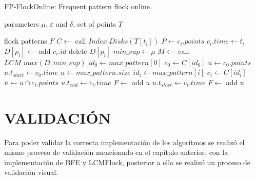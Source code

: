 \begin{algorithm}
    \renewcommand{\algorithmicrequire}{\textbf{Input:}}
    \renewcommand{\algorithmicensure}{\textbf{Output:}}
    \renewcommand{\algorithmicprint}{\textbf{break}}
  \caption{FP-FlockOnline: Frequent pattern flock  online.}

  \label{alg:framework2}


  \footnotesize

  \begin{algorithmic}[1]

\REQUIRE parameters $\mu$, $\varepsilon$ and $\delta$,
set of points $T$ 

\ENSURE flock patterns $F$
    \STATE $C \leftarrow$ call $Index.Disks(T[t_i])$     
      \STATE $P \leftarrow c_i.points$ 
	  \STATE $c_i.time \leftarrow t_i$
	  \STATE $D[p_i] \leftarrow $ add $c_i.id$
      \ENDFOR
	    \STATE delete $D[p_i]$
	  \ENDIF
      \ENDFOR
    \ENDFOR
  \STATE $min\_sup \leftarrow \mu$
  \STATE $M \leftarrow$ call $LCM\_max(D,min\_sup)$ 
  \STATE $id_0 \leftarrow max\_pattern[0]$
  \STATE $c_0 \leftarrow C[id_0]$
  \STATE $u \leftarrow c_0.points$
  \STATE $u.t_{start} \leftarrow c_0.time$
  \STATE $n \leftarrow max\_pattern.size$ 
	\STATE $id_i \leftarrow max\_pattern[i]$
	\STATE $c_i \leftarrow C[id_i]$
	  \STATE $u \leftarrow u \cap c_i.points$
	  \STATE $u.t_{end} \leftarrow c_i.time$
	\ELSE
		\STATE $F \leftarrow$ add $u$
		\STATE $u.t_{start} \leftarrow c_i.time$
	  \ENDIF
	\ENDIF
  \ENDFOR
	\STATE $F \leftarrow$ add $u$
  \ENDIF
\ENDFOR
\ENDFOR

\end{algorithmic}

\end{algorithm}

\section{VALIDACIÓN}
 
Para poder validar la correcta implementación de los algoritmos se realizó el mismo proceso de  
validación mencionado en el capítulo anterior, con la implementación de BFE y LCMFlock, posterior a 
ello se realizó un proceso de validación visual.  


